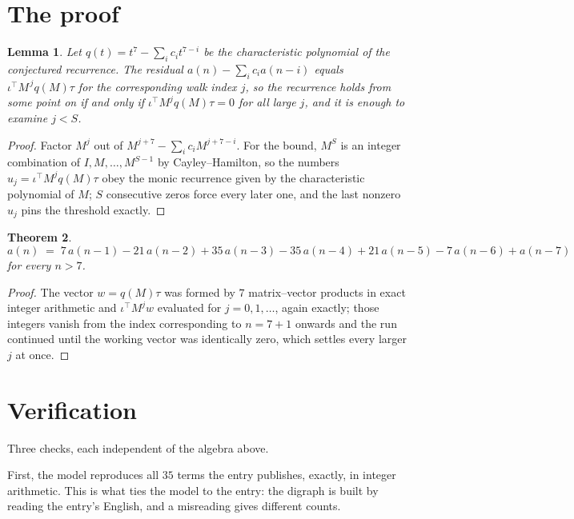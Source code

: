 \documentclass[11pt,a4paper]{article}
\theoremstyle{plain}
\newtheorem{theorem}{Theorem}
\newtheorem{lemma}[theorem]{Lemma}
\theoremstyle{definition}
\begin{document}
\section{The proof}

\begin{lemma}\label{lem:crit}
Let $q(t)=t^{7}-\sum_i c_it^{7-i}$ be the characteristic polynomial of the
conjectured recurrence. The residual $a(n)-\sum_ic_ia(n-i)$ equals
$\iota^{\!\top}M^{\,j}q(M)\tau$ for the corresponding walk index $j$, so the recurrence
holds from some point on if and only if $\iota^{\!\top}M^{j}q(M)\tau=0$ for all large $j$,
and it is enough to examine $j<S$.
\end{lemma}

\begin{proof}
Factor $M^{j}$ out of $M^{j+7}-\sum_ic_iM^{j+7-i}$. For the bound, $M^{S}$
is an integer combination of $I,M,\dots,M^{S-1}$ by Cayley--Hamilton, so the numbers
$u_j=\iota^{\!\top}M^{j}q(M)\tau$ obey the monic recurrence given by the characteristic
polynomial of $M$; $S$ consecutive zeros force every later one, and the last nonzero $u_j$
pins the threshold exactly.
\end{proof}

\begin{theorem}
\[
a(n)\;=\;7\,a(n-1) - 21\,a(n-2) + 35\,a(n-3) - 35\,a(n-4) + 21\,a(n-5) - 7\,a(n-6) + a(n-7)
\]
for every $n>7$.
\end{theorem}

\begin{proof}
The vector $w=q(M)\tau$ was formed by $7$ matrix--vector products in exact integer
arithmetic and $\iota^{\!\top}M^{j}w$ evaluated for $j=0,1,\dots$, again exactly; those
integers vanish from the index corresponding to $n=7+1$ onwards and the run continued
until the working vector was identically zero, which settles every larger $j$ at once.
\end{proof}

\section{Verification}

Three checks, each independent of the algebra above.

First, the model reproduces all $35$ terms the entry publishes, exactly, in integer
arithmetic. This is what ties the model to the entry: the digraph is built by reading the
entry's English, and a misreading gives different counts.
\end{document}
